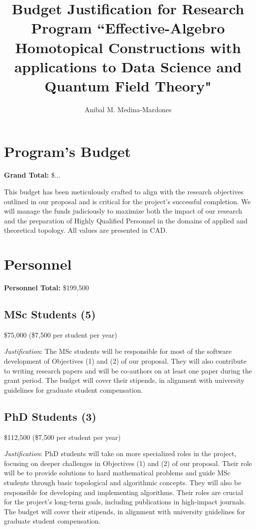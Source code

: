 \documentclass{amsart}
\title{Budget Justification for Research Program ``Effective-Algebro Homotopical Constructions with applications to Data Science and Quantum Field Theory"}
\author{Anibal M. Medina-Mardones}
\begin{document}
	\maketitle

	\section*{Program's Budget}
	\textbf{Grand Total:} \$...
	\par This budget has been meticulously crafted to align with the research objectives outlined in our proposal and is critical for the project's successful completion. We will manage the funds judiciously to maximize both the impact of our research and the preparation of Highly Qualified Personnel in the domains of applied and theoretical topology.
	All values are presented in CAD.

	\section*{Personnel}
	\textbf{Personnel Total:} \$199,500

	\subsection*{MSc Students (5)}
	\$75,000 (\$7,500 per student per year)
	\par\noindent\textit{Justification}:
	The MSc students will be responsible for most of the software development of Objectives (1) and (2) of our proposal. They will also contribute to writing research papers and will be co-authors on at least one paper during the grant period. The budget will cover their stipends, in alignment with university guidelines for graduate student compensation.

	\subsection*{PhD Students (3)}
	\$112,500 (\$7,500 per student per year)
	\par\noindent\textit{Justification}:
	PhD students will take on more specialized roles in the project, focusing on deeper challenges in Objectives (1) and (2) of our proposal. Their role will be to provide solutions to hard mathematical problems and guide MSc students through basic topological and algorithmic concepts. They will also be responsible for developing and implementing algorithms. Their roles are crucial for the project's long-term goals, including publications in high-impact journals. The budget will cover their stipends, in alignment with university guidelines for graduate student compensation.
\end{document}
